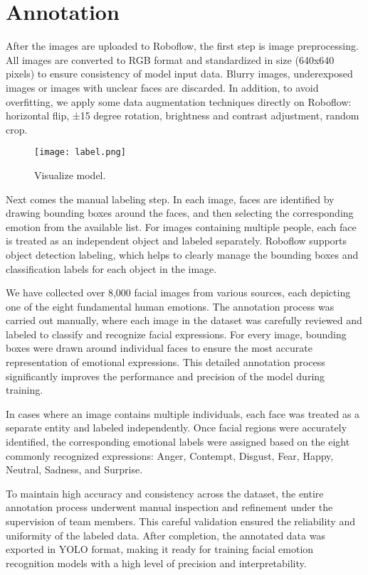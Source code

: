 \documentclass[a4paper,13pt]{report}
\begin{document}
\section{Annotation}
After the images are uploaded to Roboflow, the first step is image preprocessing. All images are converted to RGB format and standardized in size (640x640 pixels) to ensure consistency of model input data. Blurry images, underexposed images or images with unclear faces are discarded. In addition, to avoid overfitting, we apply some data augmentation techniques directly on Roboflow: horizontal flip, ±15 degree rotation, brightness and contrast adjustment, random crop.

\begin{figure}[H]
  \centering
  \texttt{[image: label.png]}
  \caption{Visualize model.}
  \label{fig:method}
\end{figure}


Next comes the manual labeling step. In each image, faces are identified by drawing bounding boxes around the faces, and then selecting the corresponding emotion from the available list. For images containing multiple people, each face is treated as an independent object and labeled separately. Roboflow supports object detection labeling, which helps to clearly manage the bounding boxes and classification labels for each object in the image.

We have collected over 8,000 facial images from various sources, each depicting one of the eight fundamental human emotions. The annotation process was carried out manually, where each image in the dataset was carefully reviewed and labeled to classify and recognize facial expressions. For every image, bounding boxes were drawn around individual faces to ensure the most accurate representation of emotional expressions. This detailed annotation process significantly improves the performance and precision of the model during training.

In cases where an image contains multiple individuals, each face was treated as a separate entity and labeled independently. Once facial regions were accurately identified, the corresponding emotional labels were assigned based on the eight commonly recognized expressions: Anger, Contempt, Disgust, Fear, Happy, Neutral, Sadness, and Surprise.

To maintain high accuracy and consistency across the dataset, the entire annotation process underwent manual inspection and refinement under the supervision of team members. This careful validation ensured the reliability and uniformity of the labeled data. After completion, the annotated data was exported in YOLO format, making it ready for training facial emotion recognition models with a high level of precision and interpretability.
\end{document}
